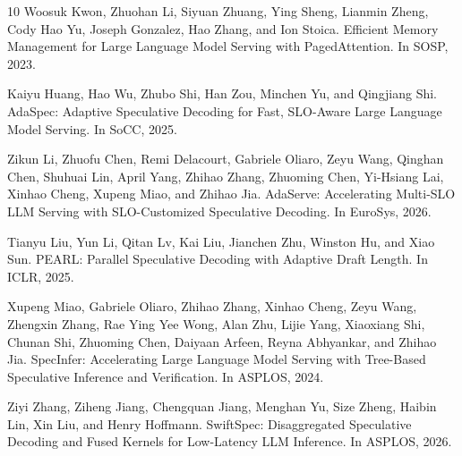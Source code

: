 \documentclass[sigplan,10pt,review,nonacm,anonymous]{acmart}
\begin{document}
\begin{thebibliography}{10}
Woosuk Kwon, Zhuohan Li, Siyuan Zhuang, Ying Sheng, Lianmin Zheng, Cody Hao Yu, Joseph Gonzalez, Hao Zhang, and Ion Stoica.
\newblock Efficient Memory Management for Large Language Model Serving with PagedAttention.
\newblock In SOSP, 2023.

Kaiyu Huang, Hao Wu, Zhubo Shi, Han Zou, Minchen Yu, and Qingjiang Shi.
\newblock AdaSpec: Adaptive Speculative Decoding for Fast, SLO-Aware Large Language Model Serving.
\newblock In SoCC, 2025.

Zikun Li, Zhuofu Chen, Remi Delacourt, Gabriele Oliaro, Zeyu Wang, Qinghan Chen, Shuhuai Lin, April Yang, Zhihao Zhang, Zhuoming Chen, Yi-Hsiang Lai, Xinhao Cheng, Xupeng Miao, and Zhihao Jia.
\newblock AdaServe: Accelerating Multi-SLO LLM Serving with SLO-Customized Speculative Decoding.
\newblock In EuroSys, 2026.

Tianyu Liu, Yun Li, Qitan Lv, Kai Liu, Jianchen Zhu, Winston Hu, and Xiao Sun.
\newblock PEARL: Parallel Speculative Decoding with Adaptive Draft Length.
\newblock In ICLR, 2025.

Xupeng Miao, Gabriele Oliaro, Zhihao Zhang, Xinhao Cheng, Zeyu Wang, Zhengxin Zhang, Rae Ying Yee Wong, Alan Zhu, Lijie Yang, Xiaoxiang Shi, Chunan Shi, Zhuoming Chen, Daiyaan Arfeen, Reyna Abhyankar, and Zhihao Jia.
\newblock SpecInfer: Accelerating Large Language Model Serving with Tree-Based Speculative Inference and Verification.
\newblock In ASPLOS, 2024.

Ziyi Zhang, Ziheng Jiang, Chengquan Jiang, Menghan Yu, Size Zheng, Haibin Lin, Xin Liu, and Henry Hoffmann.
\newblock SwiftSpec: Disaggregated Speculative Decoding and Fused Kernels for Low-Latency LLM Inference.
\newblock In ASPLOS, 2026.
\end{thebibliography}
\end{document}
